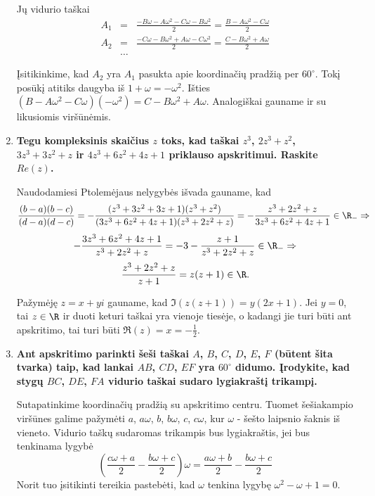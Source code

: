 \begin{enumerate}
Jų vidurio taškai
\begin{eqnarray*}
A_1 &=& \frac{-B\omega - A\omega^2-C\omega - B\omega^2}{2} = \frac{B - A\omega^2-C\omega }{2}\\
A_2 &=& \frac{-C\omega - B\omega^2+A\omega - C\omega^2}{2} = \frac{C - B\omega^2+A\omega }{2}\\
&\dots&
\end{eqnarray*}

Įsitikinkime, kad $A_2$ yra $A_1$ pasukta apie koordinačių pradžią per $60^{\circ}$. Tokį posūkį atitiks daugyba iš $1 + \omega = -\omega^2$. Išties $(B - A\omega^2-C\omega)(-\omega ^2) = C - B\omega^2+A\omega$. Analogiškai gauname ir su likusiomis viršūnėmis. 
\medskip

\item \textbf{Tegu kompleksinis skaičius $z$ toks, kad taškai $z^3$, $2z^3 + z^2$, $3z^3 + 3z^2 + z$ ir $4z^3 + 6z^2 + 4z + 1$ priklauso apskritimui. Raskite $Re(z)$.}
\medskip

Naudodamiesi Ptolemėjaus nelygybės išvada gauname, kad $$\frac{(b-a)(b-c)}{(d-a)(d-c)} = -\frac{(z^3+ 3z^2 + 3z + 1)(z^3 + z^2)}{(3z^3 + 6z^2 + 4z + 1)(z^3 + 2z^2 + z)} = -\frac{z^3 + 2z^2 + z}{3z^3 + 6z^2 + 4z +1} \in \R_{-} \Rightarrow$$
$$-\frac{3z^3 + 6z^2 + 4z +1}{z^3 + 2z^2 + z} = - 3 - \frac{z+1}{z^3 + 2z^2 + z} \in \R_{-} \Rightarrow$$
$$\frac{z^3 + 2z^2 + z}{z+1} = z(z+1) \in \R.$$

Pažymėję $z = x+yi$ gauname, kad $\Im(z(z+1)) = y(2x+1)$. Jei $y=0$, tai $z\in \R$ ir duoti keturi taškai yra vienoje tiesėje, o kadangi jie turi būti ant apskritimo, tai turi būti $\Re(z) = x = - \frac{1}{2}.$

\medskip

\item \textbf{Ant apskritimo parinkti šeši taškai $A$, $B$, $C$, $D$, $E$, $F$ (būtent šita tvarka) taip, kad lankai $AB$, $CD$, $EF$ yra $60^{\circ}$ didumo. Įrodykite, kad stygų $BC$, $DE$, $FA$ vidurio taškai sudaro lygiakraštį trikampį. }
\medskip

Sutapatinkime koordinačių pradžią su apskritimo centru. Tuomet šešiakampio viršūnes galime pažymėti $a$, $a\omega$, $b$, $b\omega$, $c$, $c\omega$, kur $\omega$ - šešto laipsnio šaknis iš vieneto. Vidurio taškų sudaromas trikampis bus lygiakraštis, jei bus tenkinama lygybė $$(\frac{c\omega + a}{2} - \frac{b\omega + c}{2})\omega = \frac{a\omega + b}{2} - \frac{b\omega + c}{2}$$ Norit tuo įsitikinti tereikia pastebėti, kad $\omega$ tenkina lygybę $\omega^2 - \omega + 1 = 0$.
\medskip


\end{enumerate}
